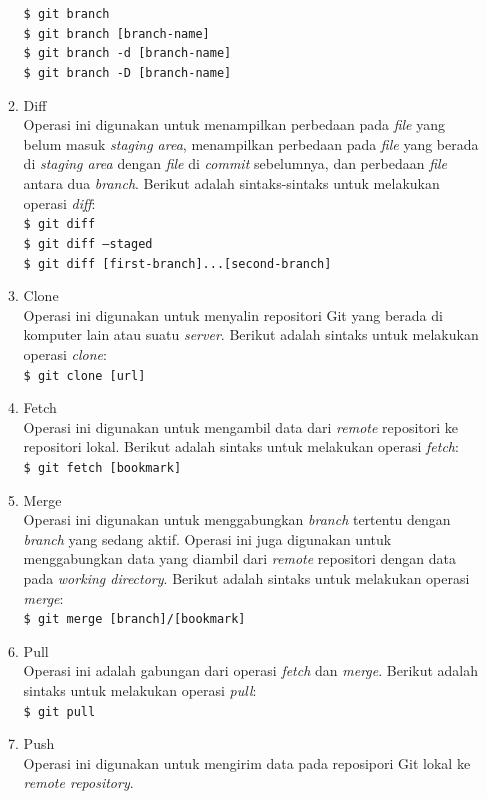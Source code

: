 \documentclass[a4paper,twoside]{article}
\begin{document}
\begin{enumerate}
\begin{enumerate}
\texttt{\$ git branch}\\ 
\texttt{\$ git branch [branch-name]}\\
\texttt{\$ git branch -d [branch-name]}\\
\texttt{\$ git branch -D [branch-name]} 
\item Diff\\
Operasi ini digunakan untuk menampilkan perbedaan pada \textit{file} yang belum masuk \textit{staging area}, menampilkan perbedaan pada \textit{file} yang berada di \textit{staging area} dengan \textit{file} di \textit{commit} sebelumnya, dan perbedaan \textit{file} antara dua \textit{branch}.  Berikut adalah sintaks-sintaks untuk melakukan operasi \textit{diff}:\\
\texttt{\$ git diff} \\
\texttt{\$ git diff --staged}\\
\texttt{\$ git diff [first-branch]...[second-branch]}
\item Clone\\
Operasi ini digunakan untuk menyalin repositori Git yang berada di komputer lain atau suatu \textit{server}. Berikut adalah sintaks untuk melakukan operasi \textit{clone}:\\
\texttt{\$ git clone [url]}
\item Fetch\\
Operasi ini digunakan untuk mengambil data dari \textit{remote} repositori ke repositori lokal. Berikut adalah sintaks untuk melakukan operasi \textit{fetch}:\\
\texttt{\$ git fetch [bookmark]}
\item Merge\\
Operasi ini digunakan untuk menggabungkan \textit{branch} tertentu dengan \textit{branch} yang sedang aktif. Operasi ini juga digunakan untuk menggabungkan data yang diambil dari \textit{remote} repositori dengan data pada \textit{working directory}. Berikut adalah sintaks untuk melakukan operasi \textit{merge}:\\
\texttt{\$ git merge [branch]/[bookmark]}
\item Pull\\
Operasi ini adalah gabungan dari operasi \textit{fetch} dan \textit{merge}. Berikut adalah sintaks untuk melakukan operasi \textit{pull}:\\
\texttt{\$ git pull}
\item Push\\
Operasi ini digunakan untuk mengirim data pada reposipori Git lokal ke \textit{remote repository}.

\end{enumerate}
\end{enumerate}
\end{document}
